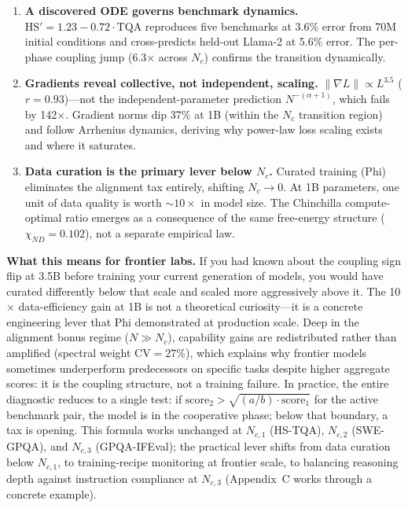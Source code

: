 \documentclass[11pt]{article}
\begin{document}
\begin{enumerate}[leftmargin=1.5em,itemsep=4pt]
  \item \textbf{A discovered ODE governs benchmark dynamics.}
    $\mathrm{HS}' = 1.23 - 0.72\cdot\mathrm{TQA}$ reproduces five benchmarks at 3.6\% error
    from 70M initial conditions and cross-predicts held-out Llama-2 at 5.6\% error.
    The per-phase coupling jump (6.3$\times$ across $N_c$) confirms the transition dynamically.

  \item \textbf{Gradients reveal collective, not independent, scaling.}
    $\|\nabla L\| \propto L^{3.5}$ ($r = 0.93$)---not the independent-parameter prediction $N^{-(\alpha+1)}$,
    which fails by 142$\times$.
    Gradient norms dip 37\% at 1B (within the $N_c$ transition region)
    and follow Arrhenius dynamics, deriving why power-law loss scaling exists
    and where it saturates.

  \item \textbf{Data curation is the primary lever below $N_c$.}
    Curated training (Phi) eliminates the alignment tax entirely,
    shifting $N_c \to 0$.
    At 1B parameters, one unit of data quality is worth ${\sim}10\times$ in model size.
    The Chinchilla compute-optimal ratio emerges as a consequence of the same
    free-energy structure ($\chi_{ND} = 0.102$), not a separate empirical law.
\end{enumerate}

\textbf{What this means for frontier labs.}
If you had known about the coupling sign flip at 3.5B before training your current generation of models, you would have curated differently below that scale and scaled more aggressively above it.
The 10$\times$ data-efficiency gain at 1B is not a theoretical curiosity---it is a concrete engineering lever that Phi demonstrated at production scale.
Deep in the alignment bonus regime ($N \gg N_c$), capability gains are redistributed rather than amplified (spectral weight CV$=27\%$), which explains why frontier models sometimes underperform predecessors on specific tasks despite higher aggregate scores: it is the coupling structure, not a training failure.
In practice, the entire diagnostic reduces to a single test: if $\text{score}_2 > \sqrt{(a/b)\cdot\text{score}_1}$ for the active benchmark pair, the model is in the cooperative phase; below that boundary, a tax is opening.
This formula works unchanged at $N_{c,1}$ (HS-TQA), $N_{c,2}$ (SWE-GPQA), and $N_{c,3}$ (GPQA-IFEval); the practical lever shifts from data curation below $N_{c,1}$, to training-recipe monitoring at frontier scale, to balancing reasoning depth against instruction compliance at $N_{c,3}$ (Appendix~C works through a concrete example).
\end{document}
